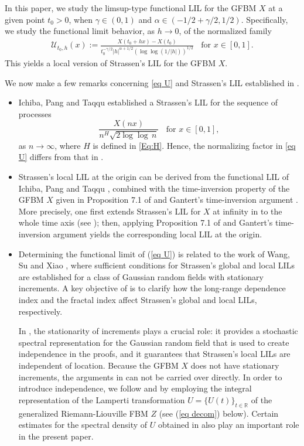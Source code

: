 \documentclass[11pt, reqno]{amsart}
\numberwithin{equation}{section}
\newcommand{\1}{{\bf 1}}
\newcommand{\2}{{\bf 2}}
\begin{document}
In this paper,  we study the limsup-type functional LIL for 
the GFBM $X$ at a given point $t_0>0$,  {when
$\gamma\in (0,1)$ and 
$\alpha\in (-1/2+\gamma/2, 1/2)$}. Specifically, we study the functional limit
behavior, as   $h \to 0$,  of the  normalized family
 \begin{align}\label{eq U}
  \mathcal U_{t_0, h}(x):=\frac{X(t_0+hx)-X(t_0)}{t_0^{-\gamma/2} |h|^{\alpha+1/2}\left(  {\log\log}(1/|h|)\right)^{1/2}}
  \ \ \ \ \text{for  } x\in [0,1].
   \end{align}
This yields a local version of Strassen's LIL for the GFBM $X$.

We now make a few remarks concerning \eqref{eq U} and Strassen's LIL established in \cite{IPT2021,WSX2020}. 
\begin{itemize}
\item Ichiba, Pang and Taqqu \cite{IPT2021} established a Strassen's LIL for the sequence of processes
$$
\frac{X(nx)}{ n^{H}\sqrt{ 2  {\log\log}\, n}}
  \ \ \ \ \text{for  }  x\in [0,1],
$$
as $n \to \infty$, where $H$ is defined in \eqref{Eq:H}. 
Hence,  the normalizing factor in \eqref{eq U} differs from 
that  in \cite{IPT2021}.

\item  Strassen's local LIL at the origin can be derived from the functional LIL of Ichiba, Pang and Taqqu \cite[Theorem 5.1]{IPT2021}, combined with
 the time-inversion property of the GFBM $X$  given in Proposition 7.1 of \cite{WX2021a}
and Gantert's time-inversion argument  \cite{Gantert}.
More precisely,  one first extends  Strassen's LIL for $X$ at infinity in \cite[Theorem 5.1]{IPT2021}  to the   
whole time axis  (see \cite[Theorem 1.4.1]{DS1989}); then,    applying Proposition 7.1 of \cite{WX2021a} and Gantert's time-inversion 
  argument yields the corresponding local LIL at the origin.

\item Determining  the functional limit of (\ref{eq U}) is related to the work of  Wang, Su and
Xiao \cite{WSX2020}, where sufficient conditions for Strassen's global and local LILs are established for a class of Gaussian random fields with stationary increments.  A key objective of \cite{WSX2020} is to clarify  how the long-range dependence index and the fractal index affect Strassen’s global and local LILs, respectively.

In \cite{WSX2020}, the stationarity of increments plays a crucial  role: it provides a stochastic spectral representation for the Gaussian random field that is used to create independence 
in the proofs, and it  guarantees that Strassen's local  LILs  are independent of location. Because the GFBM $X$ does not have stationary increments, the arguments in \cite{WSX2020} 
can not be carried over directly. In order to introduce independence,  we follow  \cite{TX2007} and \cite{WX2021a} by employing the integral representation of the Lamperti transformation 
$U = \{U(t)\}_{t \in \mathbb R}$ of the generalized Riemann-Liouville FBM  $Z$ (see (\ref{eq decom}) below). Certain estimates for the spectral density of $U$ obtained in \cite{WX2021a} 
also play an important role in the present paper.
\end{itemize}
\end{document}
